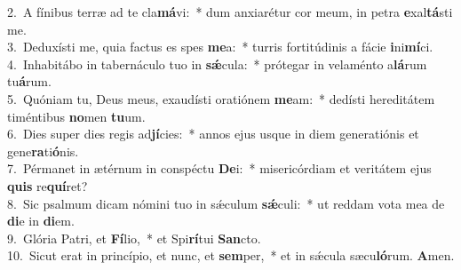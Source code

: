 {2.~}A fínibus terræ ad te cla\textbf{má}vi:~* dum anxiarétur cor meum, in petra \textbf{e}xal\textbf{tá}sti me.\\
{3.~}Deduxísti me, quia factus es spes \textbf{me}a:~* turris fortitúdinis a fácie \textbf{i}ni\textbf{mí}ci.\\
{4.~}Inhabitábo in tabernáculo tuo in \textbf{sǽ}cula:~* prótegar in velaménto a\textbf{lá}rum tu\textbf{á}rum.\\
{5.~}Quóniam tu, Deus meus, exaudísti oratiónem \textbf{me}am:~* dedísti hereditátem timéntibus \textbf{no}men \textbf{tu}um.\\
{6.~}Dies super dies regis ad\textbf{jí}cies:~* annos ejus usque in diem generatiónis et gene\textbf{ra}ti\textbf{ó}nis.\\
{7.~}Pérmanet in ætérnum in conspéctu \textbf{De}i:~* misericórdiam et veritátem ejus \textbf{quis} re\textbf{quí}ret?\\
{8.~}Sic psalmum dicam nómini tuo in sǽculum \textbf{sǽ}culi:~* ut reddam vota mea de \textbf{di}e in \textbf{di}em.\\
{9.~}Glória Patri, et \textbf{Fí}lio,~* et Spi\textbf{rí}tui \textbf{San}cto.\\
{10.~}Sicut erat in princípio, et nunc, et \textbf{sem}per,~* et in sǽcula sæcu\textbf{ló}rum. \textbf{A}men.\\
